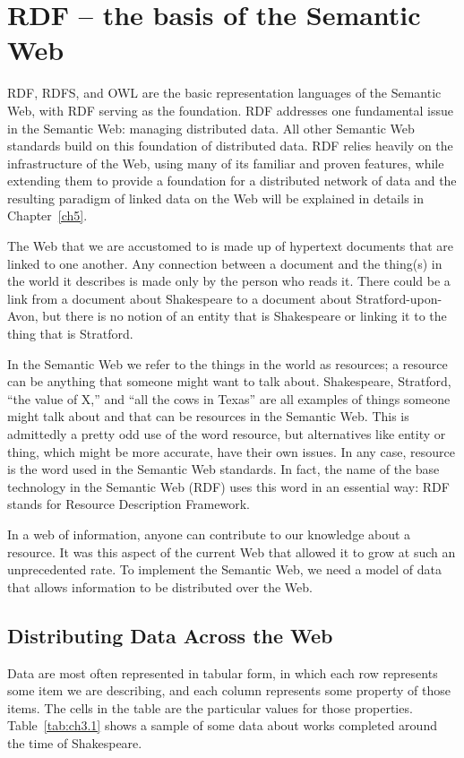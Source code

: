 \chapter{RDF -- the basis of the Semantic Web}
\label{ch3}
RDF, RDFS, and OWL are the basic representation languages of the
Semantic Web, with RDF serving as the foundation. RDF addresses one
fundamental issue in the Semantic Web: managing distributed data. All
other Semantic Web standards build on this foundation of distributed
data. RDF relies heavily on the infrastructure of the Web, using many of
its familiar and proven features, while extending them to provide a
foundation for a distributed network of data and the resulting paradigm
of linked data on the Web will be explained in details in Chapter~\ref{ch5}.

The Web that we are accustomed to is made up of hypertext documents that are
linked to one another. Any connection between a document and the
thing(s) in the world it describes is made only by the person who reads
it. There could be a link from a document about Shakespeare to
a document about Stratford-upon-Avon, but there is no notion of an
entity that is Shakespeare or linking it to the thing that is Stratford.

In the Semantic Web we refer to the things in the world as resources; a
resource can be anything that someone might want to talk about. Shakespeare, Stratford, ``the
value of X,'' and ``all the cows in Texas'' are all examples of things
someone might talk about and that can be resources in the Semantic Web.
This is admittedly a pretty odd use of the word resource, but
alternatives like entity or thing, which might be more accurate, have
their own issues. In any case, resource is the word used in the
Semantic Web standards. In fact, the name of the base technology in the
Semantic Web (RDF) uses this word in an essential way: RDF stands for
Resource Description Framework.

In a web of information, anyone can contribute to our knowledge about a
resource. It was this aspect of the current Web that allowed it to grow
at such an unprecedented rate. To implement the Semantic Web, we need a
model of data that allows information to be distributed over the Web.

\section{Distributing Data Across the Web}

Data are most often represented in tabular form, in which each row
represents some item we are describing, and each column represents some
property of those items. The cells in the table are the particular
values for those properties. Table~\ref{tab:ch3.1} shows a sample of some data about
works completed around the time of Shakespeare.

